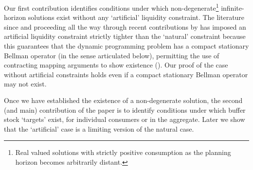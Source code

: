 \documentclass[BufferStockTheory]{subfiles}
\begin{document}

Our first contribution identifies conditions under which non-degenerate\footnote{Real valued solutions with strictly positive consumption as the planning horizon becomes arbitrarily distant.} infinite-horizon solutions exist without any `artificial' liquidity constraint.  The literature since \cite{bewleyPIH} and proceeding all the way through recent contributions by \cite{mstIncFluct,maUnboundedDP} has imposed an artificial liquidity constraint strictly tighter than the `natural' constraint because this guarantees that the dynamic programming problem has a compact stationary Bellman operator (in the sense articulated below), permitting the use of contracting mapping arguments to show existence (\cite{stachurski2022}).  Our proof of the case without artificial constraints holds even if a compact stationary Bellman operator may not exist.

Once we have established the existence of a non-degenerate solution, the second (and main) contribution of the paper is to identify conditions under which buffer stock `targets' exist, for individual consumers or in the aggregate.  Later we show that the `artificial' case is a limiting version of the natural case.



%
\end{document}
